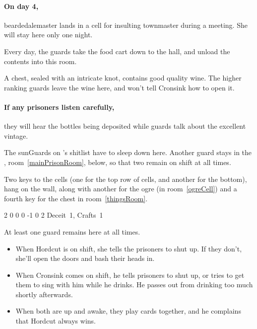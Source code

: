 \begin{multicols}{2}
\paragraph{On day 4,}
\gls{beardedalemaster} lands in a cell for insulting \gls{townmaster} during a meeting.
She will stay here only one night.


Every day, the guards take the food cart down to the hall, and unload the contents into this room.

A chest, sealed with an intricate knot, contains good quality wine.
The higher ranking guards leave the wine here, and won't tell Cronsink how to open it.

\paragraph{If any prisoners listen carefully,}
they will hear the bottles being deposited while guards talk about the excellent vintage.


The \glspl{sunGuard} on 's shitlist have to sleep down here.
Another guard stays in the , room~\ref{mainPrisonRoom}, below, so that two remain on shift at all times.

Two keys to the cells (one for the top row of cells, and another for the bottom), hang on the wall, along with another for the ogre (in room~\ref{ogreCell}) and a fourth key for the chest in room~\ref{thingsRoom}.

{2}%
{0}%
{{0}%
{0}%
{-1}}%
{0}%
{2}%
{
  Deceit~1, Crafts~1
  \knacks{\brawler, \berserker}
}%
{\shortsword}%
{}


At least one guard remains here at all times.
\begin{itemize}
  \item
  When Hordcut is on shift, she tells the prisoners to shut up.
  If they don't, she'll open the doors and bash their heads in.
  \item
  When Cronsink comes on shift, he tells prisoners to shut up, or tries to get them to sing with him while he drinks.
  He passes out from drinking too much shortly afterwards.
  \item
  When both are up and awake, they play cards together, and he complains that Hordcut always wins.
\end{itemize}


\end{multicols}

